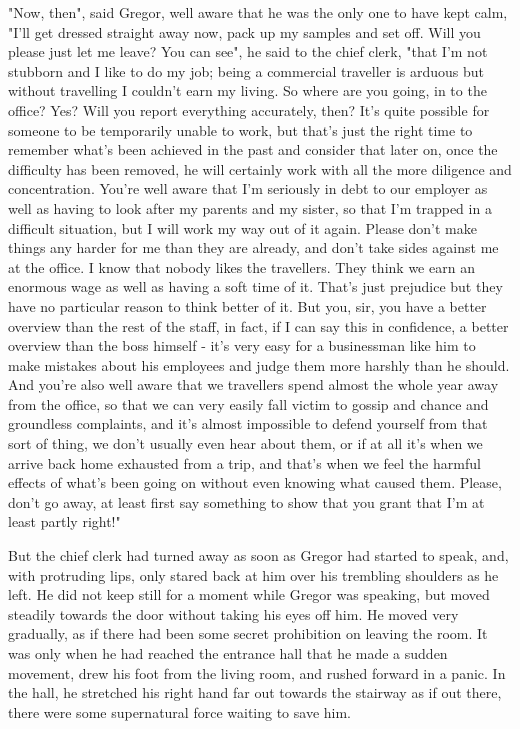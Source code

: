 \documentclass[12pt]{book}
\begin{document}
    "Now, then", said Gregor, well aware that he was the only one to have kept calm, "I'll get dressed straight away now, pack up my samples and set off. Will you please just let me leave? You can see", he said to the chief clerk, "that I'm not stubborn and I like to do my job; being a commercial traveller is arduous but without travelling I couldn't earn my living. So where are you going, in to the office? Yes? Will you report everything accurately, then? It's quite possible for someone to be temporarily unable to work, but that's just the right time to remember what's been achieved in the past and consider that later on, once the difficulty has been removed, he will certainly work with all the more diligence and concentration. You're well aware that I'm seriously in debt to our employer as well as having to look after my parents and my sister, so that I'm trapped in a difficult situation, but I will work my way out of it again. Please don't make things any harder for me than they are already, and don't take sides against me at the office. I know that nobody likes the travellers. They think we earn an enormous wage as well as having a soft time of it. That's just prejudice but they have no particular reason to think better of it. But you, sir, you have a better overview than the rest of the staff, in fact, if I can say this in confidence, a better overview than the boss himself - it's very easy for a businessman like him to make mistakes about his employees and judge them more harshly than he should. And you're also well aware that we travellers spend almost the whole year away from the office, so that we can very easily fall victim to gossip and chance and groundless complaints, and it's almost impossible to defend yourself from that sort of thing, we don't usually even hear about them, or if at all it's when we arrive back home exhausted from a trip, and that's when we feel the harmful effects of what's been going on without even knowing what caused them. Please, don't go away, at least first say something to show that you grant that I'm at least partly right!"

    But the chief clerk had turned away as soon as Gregor had started to speak, and, with protruding lips, only stared back at him over his trembling shoulders as he left. He did not keep still for a moment while Gregor was speaking, but moved steadily towards the door without taking his eyes off him. He moved very gradually, as if there had been some secret prohibition on leaving the room. It was only when he had reached the entrance hall that he made a sudden movement, drew his foot from the living room, and rushed forward in a panic. In the hall, he stretched his right hand far out towards the stairway as if out there, there were some supernatural force waiting to save him.
\end{document}
